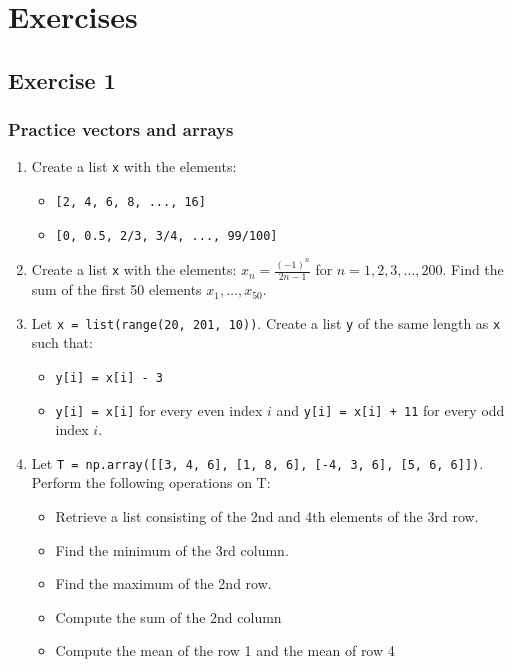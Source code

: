 \section{Exercises}
\subsection*{Exercise 1}
\begin{frame}[fragile]
  \frametitle{Practice vectors and arrays}
  \begin{enumerate}
    \item Create a list \lstinline|x| with the elements:
    \begin{itemize}
      \item \lstinline|[2, 4, 6, 8, ..., 16]|
      \item \lstinline|[0, 0.5, 2/3, 3/4, ..., 99/100]|
    \end{itemize}
    \item Create a list \lstinline|x| with the elements: \(x_n = \frac{(-1)^n}{2n-1}\) for \(n=1,2,3,\ldots,200\). Find the sum of the first 50 elements \(x_1,\ldots,x_{50}\).
    \item Let \lstinline|x = list(range(20, 201, 10))|. Create a list \lstinline|y| of the same length as \lstinline|x| such that:
    \begin{itemize}
      \item \lstinline|y[i] = x[i] - 3|
      \item \lstinline|y[i] = x[i]| for every even index \(i\) and \lstinline|y[i] = x[i] + 11| for every odd index \(i\).
    \end{itemize}
    \item Let \lstinline|T = np.array([[3, 4, 6], [1, 8, 6], [-4, 3, 6], [5, 6, 6]])|. Perform the following operations on T:
    \begin{itemize}
      \item Retrieve a list consisting of the 2nd and 4th elements of the 3rd row.
      \item Find the minimum of the 3rd column.
      \item Find the maximum of the 2nd row.
      \item Compute the sum of the 2nd column
      \item Compute the mean of the row 1 and the mean of row 4
    \end{itemize}
  \end{enumerate}
 \end{frame}


